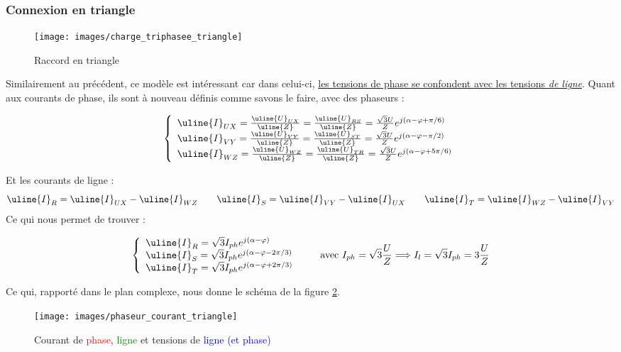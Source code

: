 \documentclass[12pt,a4paper]{article}
\newcommand{\uz}{\uline{Z} }
\newcommand{\ui}{\uline{I} }
\newcommand{\uu}{\uline{U} }
\begin{document}
\subsubsection{Connexion en triangle}
\begin{figure}
	\centering
	\texttt{[image: images/charge\_triphasee\_triangle]}
	\caption{Raccord en triangle}
	\label{fig: charge triphase triangle}
\end{figure}
Similairement au précédent, ce modèle est intéressant car dans celui-ci, \uline{les tensions de phase se confondent avec les tensions \textit{de ligne}}. Quant aux courants de phase, ils sont à nouveau définis comme savons le faire, avec des phaseurs :

\begin{equation*}
	\left\{\begin{array}{l}
		\ui_{UX} = \frac{\uu_{UX}}{\uz} = \frac{\uu_{RS}}{\uz} = \frac{\sqrt{3}U}{Z}e^{j(\alpha - \varphi + \pi/6)}\\
		\ui_{VY} = \frac{\uu_{VY}}{\uz} = \frac{\uu_{ST}}{\uz} = \frac{\sqrt{3}U}{Z}e^{j(\alpha - \varphi - \pi/2)}\\
	\ui_{WZ} = \frac{\uu_{WZ}}{\uz} = \frac{\uu_{TR}}{\uz} = \frac{\sqrt{3}U}{Z}e^{j(\alpha - \varphi + 5\pi/6)}
\end{array}\right.
\end{equation*}

Et les courants de ligne : 
\begin{equation*}
	\ui_R = \ui_{UX} - \ui_{WZ} \qquad \ui_S = \ui_{VY} - \ui_{UX} \qquad \ui_T = \ui_{WZ} - \ui_{VY}
\end{equation*}
Ce qui nous permet de trouver :

\begin{equation}
	\left\{\begin{array}{l}
		\ui_R = \sqrt{3}I_{ph}e^{j(\alpha-\varphi)}\\
		\ui_S = \sqrt{3}I_{ph}e^{j(\alpha-\varphi - 2\pi/3)}\\
		\ui_T = \sqrt{3}I_{ph}e^{j(\alpha-\varphi + 2\pi/3)}\\
	\end{array} \right. \qquad \text{avec } I_{ph} = \sqrt{3}\frac{U}{Z} \Longrightarrow I_l = \sqrt{3}I_{ph} = 3\frac{U}{Z}
\end{equation}

Ce qui, rapporté dans le plan complexe, nous donne le schéma de la figure \ref{fig: courant triangle}.
\begin{figure}
	\centering
	\texttt{[image: images/phaseur\_courant\_triangle]}
	\caption{Courant de \textcolor{red}{phase}, \textcolor{green}{ligne} et tensions de \textcolor{blue}{ligne (et phase)}}
	\label{fig: courant triangle}
\end{figure}
\end{document}
